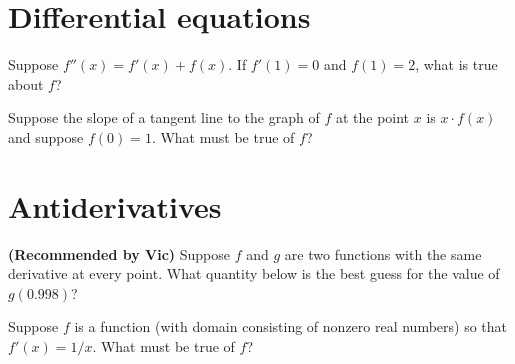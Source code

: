 \documentclass{ximera}
\newcommand{\recommendation}[1]{\textbf{(Recommended by #1)}}
\begin{document}
\clearpage

\section{Differential equations}

\begin{problem}
  Suppose $f''(x) = f'(x) + f(x)$.  If $f'(1) = 0$ and $f(1) = 2$, what is true about $f$?
  \begin{multipleChoice}
  \end{multipleChoice}
\end{problem}

\begin{problem}
  Suppose the slope of a tangent line to the graph of $f$ at the point $x$ is $x \cdot f(x)$ and suppose $f(0) = 1$.  What must be true of $f$?
  \begin{multipleChoice}
  \end{multipleChoice}
\end{problem}

\clearpage

\section{Antiderivatives}

\begin{problem}
\recommendation{Vic}
  Suppose $f$ and $g$ are two functions with the same derivative at every point.  What quantity below is the best guess for the value of $g(0.998)$?
  \begin{multipleChoice}
  \end{multipleChoice}
\end{problem}

\begin{problem}
  Suppose $f$ is a function (with domain consisting of nonzero real numbers) so that $f'(x) = 1/x$.  What must be true of $f$?
  \begin{multipleChoice}
  \end{multipleChoice}
\end{problem}
\end{document}
